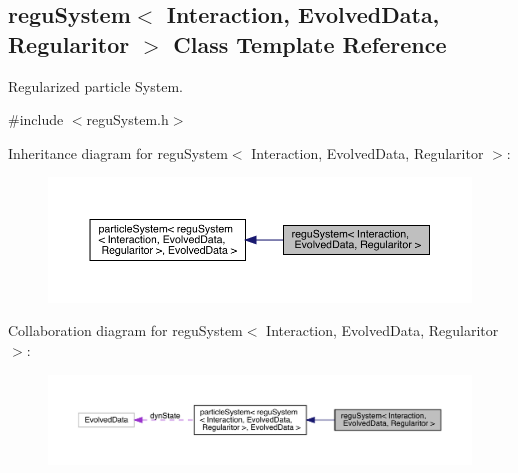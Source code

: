 \hypertarget{classregu_system}{}\subsection{regu\+System$<$ Interaction, Evolved\+Data, Regularitor $>$ Class Template Reference}
\label{classregu_system}


Regularized particle System.  




{\ttfamily \#include $<$regu\+System.\+h$>$}



Inheritance diagram for regu\+System$<$ Interaction, Evolved\+Data, Regularitor $>$\+:\nopagebreak
\begin{figure}[H]
\begin{center}
\leavevmode
\includegraphics[width=350pt]{classregu_system__inherit__graph}
\end{center}
\end{figure}


Collaboration diagram for regu\+System$<$ Interaction, Evolved\+Data, Regularitor $>$\+:\nopagebreak
\begin{figure}[H]
\begin{center}
\leavevmode
\includegraphics[width=350pt]{classregu_system__coll__graph}
\end{center}
\end{figure}
